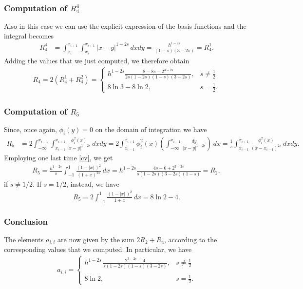 {\subsubsection*{Computation of $R_4^4$}
Also in this case we can use the explicit expression of the basis functions and the integral becomes
\begin{align*}
	R_4^4 &= \int_{x_i}^{x_{i+1}}\int_{x_i}^{x_{i+1}} |x-y|^{1-2s}\,dxdy = \frac{h^{1-2s}}{(1-s)(3-2s)}=R_4^1. 
\end{align*}
Adding the values that we just computed, we therefore obtain
\begin{align}\label{R4}
	R_4 = 2(R_4^1+R_4^2) = \begin{cases}
					\displaystyle h^{1-2s}\frac{8-8s-2^{3-2s}}{2s(1-2s)(1-s)(3-2s)}, & \displaystyle s\neq \frac{1}{2}
					\\
					8\ln 3-8\ln 2, & \displaystyle s=\frac{1}{2}.
				\end{cases}	
\end{align}

\subsubsection*{Computation of $R_5$}
Since, once again, $\phi_i(y) = 0$ on the domain of integration we have
\begin{align*}
	R_5 &= 2\int_{-\infty}^{x_{i-1}}\int_{x_{i-1}}^{x_{i+1}} \frac{\phi_i^2(x)}{|x-y|^{1+2s}}\,dxdy = 2\int_{x_{i-1}}^{x_{i+1}}\phi_i^2(x)\left(\int_{-\infty}^{x_{i-1}} \frac{dy}{|x-y|^{1+2s}}\right)\,dx = \frac{1}{s}\int_{x_{i-1}}^{x_{i+1}}\frac{\phi_i^2(x)}{(x-x_{i-1})^{2s}}\,dxdy.
\end{align*}
Employing one last time \eqref{cv}, we get
\begin{align}\label{R5}
	R_5 = \frac{h^{1-2s}}{s}\int_{-1}^1 \frac{(1-|x|\,)^2}{(1+x)^{2s}}\,dx = h^{1-2s}\frac{4s-6+2^{3-2s}}{s(1-2s)(3-2s)(1-s)}=R_2,
\end{align}
if $s\neq 1/2$. If $s=1/2$, instead, we have
\begin{align*}
	R_5 = 2\int_{-1}^1 \frac{(1-|x|\,)^2}{1+x}\,dx = 8\ln 2-4.
\end{align*}

\subsubsection*{Conclusion}
The elements $a_{i,i}$ are now given by the sum $2R_2+R_4$, according to the corresponding values that we computed. In particular, we have 
\begin{align*}
	a_{i,i} = \begin{cases}
			\displaystyle h^{1-2s}\,\frac{2^{3-2s}-4}{s(1-2s)(1-s)(3-2s)}, & \displaystyle s\neq\frac{1}{2}
			\\
			\\
			8\ln 2, & \displaystyle s=\frac{1}{2}.			
			\end{cases}	
\end{align*}

}
